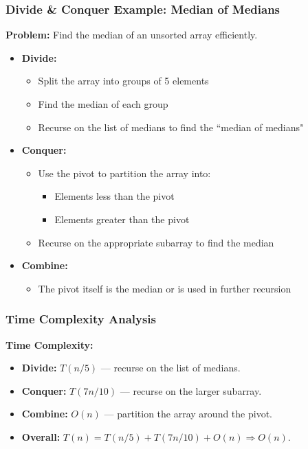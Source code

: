 \begin{frame}
  \frametitle{Divide \& Conquer Example: Median of Medians}
  
  \textbf{Problem:} Find the median of an unsorted array efficiently.
  
  \begin{itemize}
      \item \textbf{Divide:}
      \begin{itemize}
          \item Split the array into groups of 5 elements
          \item Find the median of each group
          \item Recurse on the list of medians to find the ``median of medians"
      \end{itemize}
      \vspace{0.2cm}
      \item \textbf{Conquer:}
      \begin{itemize}
          \item Use the pivot to partition the array into:
          \begin{itemize}
              \item Elements less than the pivot
              \item Elements greater than the pivot
          \end{itemize}
          \item Recurse on the appropriate subarray to find the median
      \end{itemize}
      \vspace{0.2cm}
      \item \textbf{Combine:} 
      \begin{itemize}
          \item The pivot itself is the median or is used in further recursion
      \end{itemize}
  \end{itemize}
\end{frame}
\begin{frame}
  \frametitle{Time Complexity Analysis}

  \textbf{Time Complexity:}
  \begin{itemize}
      \item \textbf{Divide:} \(T(n/5)\) — recurse on the list of medians.
      \item \textbf{Conquer:} \(T(7n/10)\) — recurse on the larger subarray.
      \item \textbf{Combine:} \(O(n)\) — partition the array around the pivot.
      \item \textbf{Overall:} \(T(n) = T(n/5) + T(7n/10) + O(n) \Rightarrow O(n)\).
  \end{itemize}
\end{frame}

